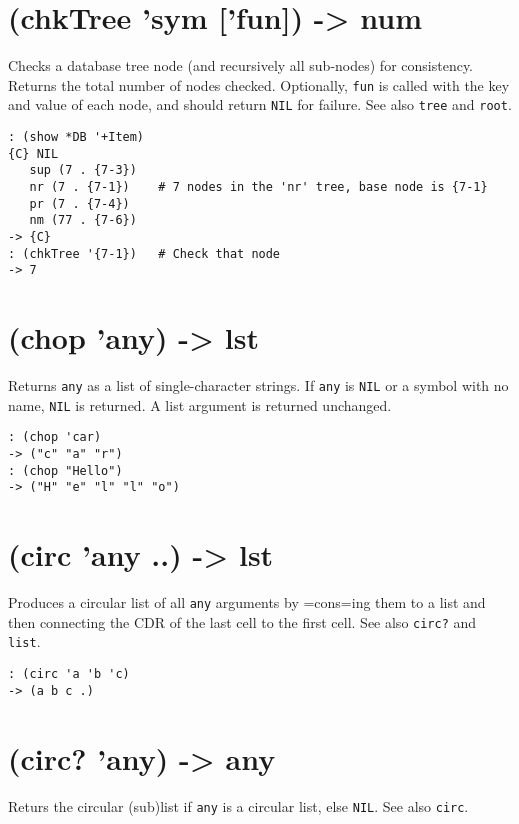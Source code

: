 { 
\section{(chkTree 'sym ['fun]) -> num}
\label{sec-8-1-3-16}


Checks a database tree node (and recursively all sub-nodes) for
consistency. Returns the total number of nodes checked. Optionally,
\texttt{fun} is called with the key and value of each node, and should return
\texttt{NIL} for failure. See also \texttt{tree} and \texttt{root}.


\begin{verbatim}
: (show *DB '+Item)
{C} NIL
   sup (7 . {7-3})
   nr (7 . {7-1})    # 7 nodes in the 'nr' tree, base node is {7-1}
   pr (7 . {7-4})
   nm (77 . {7-6})
-> {C}
: (chkTree '{7-1})   # Check that node
-> 7
\end{verbatim}

 
\section{(chop 'any) -> lst}
\label{sec-8-1-3-17}


Returns \texttt{any} as a list of single-character strings. If \texttt{any} is \texttt{NIL}
or a symbol with no name, \texttt{NIL} is returned. A list argument is returned
unchanged.


\begin{verbatim}
: (chop 'car)
-> ("c" "a" "r")
: (chop "Hello")
-> ("H" "e" "l" "l" "o")
\end{verbatim}

 
\section{(circ 'any ..) -> lst}
\label{sec-8-1-3-18}


Produces a circular list of all \texttt{any} arguments by =cons=ing them to a
list and then connecting the CDR of the last cell to the first cell. See
also \texttt{circ?} and \texttt{list}.


\begin{verbatim}
: (circ 'a 'b 'c)
-> (a b c .)
\end{verbatim}

 
\section{(circ? 'any) -> any}
\label{sec-8-1-3-19}


Returs the circular (sub)list if \texttt{any} is a circular list, else \texttt{NIL}.
See also \texttt{circ}.


}
